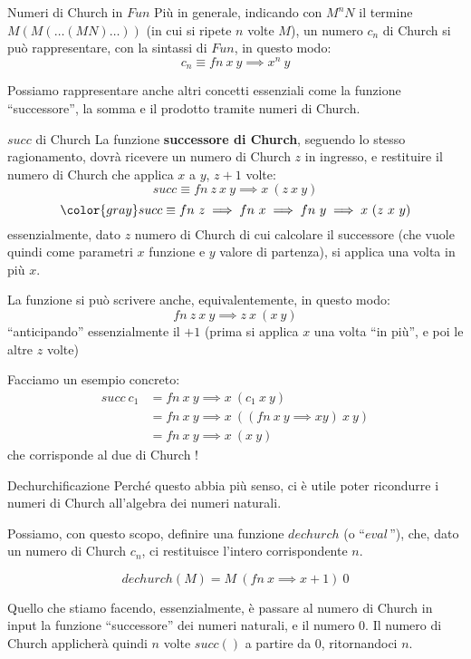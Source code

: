 \documentclass[a4paper,11pt]{report}
\begin{document}
\begin{defbox}{Numeri di Church in \( Fun \)}{}
    Più in generale, indicando con \( M^n N \) il termine \( M(M(\dots(MN)\dots)) \) {\small\color{gray}(in cui si ripete \( n \) volte \( M \))}, un numero \(c_n\) di Church si può rappresentare, con la sintassi di \( Fun \), in questo modo:
    \[ c_n \equiv fn \ x \ y \implies x^n \ y \]
\end{defbox}

Possiamo rappresentare anche altri concetti essenziali come la funzione ``successore'', la somma e il prodotto tramite numeri di Church.

\begin{defbox}{\( succ \) di Church}{}
    La funzione \textbf{successore di Church}, seguendo lo stesso ragionamento, dovrà ricevere un numero di Church \( z \) in ingresso, e restituire il numero di Church che applica \( x \) a \( y \), \( z+1 \) volte:
    \[ succ \equiv fn \ z \ x \ y \implies x\ (z \ x \ y) \]
    \[\color{gray} succ \equiv fn \ z \implies fn \ x \implies fn \ y \implies x\ (z \ x \ y) \]
    essenzialmente, dato \( z \) numero di Church di cui calcolare il successore (che vuole quindi come parametri \( x \) funzione e \( y \) valore di partenza), si applica una volta in più \( x \).

    La funzione si può scrivere anche, equivalentemente, in questo modo:
    \[ fn \ z \ x \ y \implies z \ x \ (x \ y) \]
    ``anticipando'' essenzialmente il \( +1 \) (prima si applica \( x \) una volta ``in più'', e poi le altre \( z \) volte)
\end{defbox}

Facciamo un esempio concreto:
\begin{align*}
    succ \ c_1 &= fn \ x \ y \implies x \ (c_1 \ x \ y) \\
               & = fn \ x \ y \implies x \ (( fn \ x \ y \implies xy) \ x \ y ) \\
               & = fn \ x \ y \implies x \ ( x \ y)
\end{align*}
che corrisponde al due di Church !

\begin{defbox}{Dechurchificazione}{}
    Perché questo abbia più senso, ci è utile poter ricondurre i numeri di Church all'algebra dei numeri naturali.
    
    Possiamo, con questo scopo, definire una funzione \( dechurch \) (o ``\( eval \,\)''), che, dato un numero di Church \( c_n \), ci restituisce l'intero corrispondente \( n \).

    \[ dechurch(M) = M \ (fn \ x \implies x+1) \ 0 \]

    \begin{gbox}{}
    Quello che stiamo facendo, essenzialmente, è passare al numero di Church in input la funzione ``successore'' dei numeri naturali, e il numero \( 0 \). Il numero di Church applicherà quindi \( n \) volte \( succ() \) a partire da \( 0 \), ritornandoci \( n \).
    \end{gbox}
\end{defbox}
\end{document}
